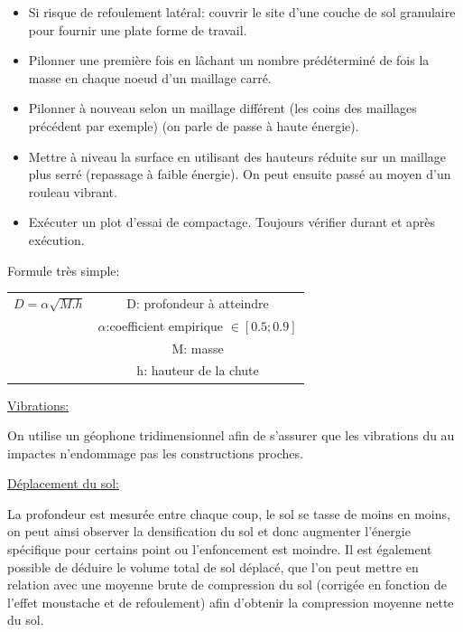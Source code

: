 \begin{itemize}
    \item Si risque de refoulement latéral: couvrir le site d'une couche de sol granulaire pour fournir une plate forme de travail.
    \item Pilonner une première fois en lâchant un nombre prédéterminé de fois la masse en chaque noeud d'un maillage carré.
    \item Pilonner à nouveau selon un maillage différent (les coins des maillages précédent par exemple) (on parle de passe à haute énergie).
    \item Mettre à niveau la surface en utilisant des hauteurs réduite sur un maillage plus serré (repassage à faible énergie). On peut ensuite passé au moyen d'un rouleau vibrant.
    \item Exécuter un plot d'essai de compactage. Toujours vérifier durant et après exécution.
\end{itemize} 

\medskip

Formule très simple:
\begin{center}
\begin{tabular}{c|c}
    $D=\alpha \sqrt{M.h}$    & D: profondeur à atteindre \\
                             & $\alpha$:coefficient empirique $\in [0.5;0.9]$ \\
                             & M: masse \\
                             & h: hauteur de la chute
\end{tabular}
\end{center}

\medskip

\underline{Vibrations:}

On utilise un géophone tridimensionnel afin de s'assurer que les vibrations du au impactes n'endommage pas les constructions proches.

\medskip

\underline{Déplacement du sol:}

La profondeur est mesurée entre chaque coup, le sol se tasse de moins en moins, on peut ainsi observer la densification du sol et donc augmenter l'énergie spécifique pour certains point ou l'enfoncement est moindre. Il est également possible de déduire le volume total de sol déplacé, que l'on peut mettre en relation avec une moyenne brute de compression du sol (corrigée en fonction de l'effet moustache et de refoulement) afin d'obtenir la compression moyenne nette du sol.

